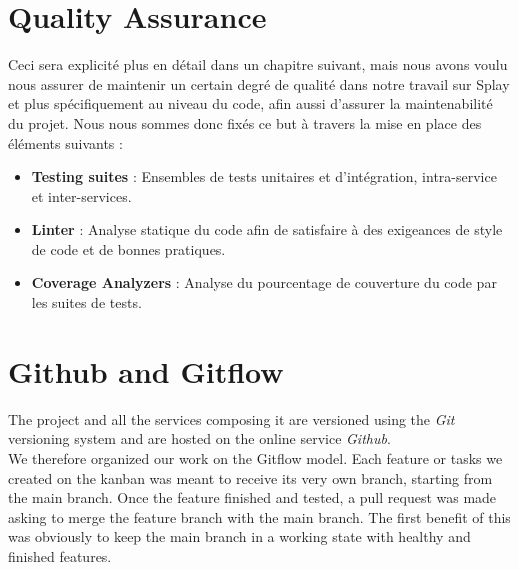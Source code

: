 \documentclass{eplmastersthesis}
\begin{document}
      \section{Quality Assurance}

        Ceci sera explicité plus en détail dans un chapitre suivant, mais nous
        avons voulu nous assurer de maintenir un certain degré de qualité dans
        notre travail sur Splay et plus spécifiquement au niveau du code, afin
        aussi d'assurer la maintenabilité du projet. Nous nous sommes donc
        fixés ce but à travers la mise en place des éléments suivants : \\

        \begin{itemize}
          \item \textbf{Testing suites} : Ensembles de tests unitaires et
          d'intégration, intra-service et inter-services.
          \item \textbf{Linter} : Analyse statique du code afin de satisfaire à
          des exigeances de style de code et de bonnes pratiques.
          \item \textbf{Coverage Analyzers} : Analyse du pourcentage de couverture
          du code par les suites de tests.
        \end{itemize}

      \section{Github and Gitflow}

        The project and all the services composing it are versioned using the
        \textit{Git} versioning system and are hosted on the online service
        \textit{Github}.\\
        We therefore organized our work on the Gitflow model. Each feature or
        tasks we created on the kanban was meant to receive its very own
        branch, starting from the main branch.
        Once the feature finished and tested, a pull request was made asking
        to merge the feature branch with the main branch.
        The first benefit of this was obviously to keep the main branch in
        a working state with healthy and finished features.\\
\end{document}
